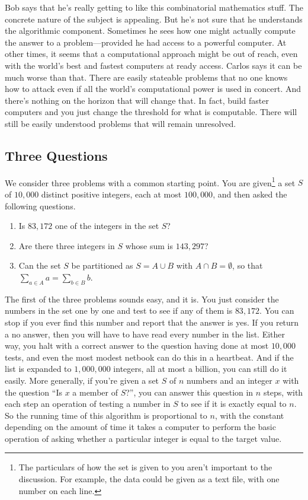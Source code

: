 \begin{discussion}
Bob says that he's really getting to like this combinatorial
mathematics stuff. The concrete nature of the subject is appealing.
But he's not sure that he understands the algorithmic component.
Sometimes he sees how one might actually compute the answer to a
problem---provided he had access to a powerful computer.  At other
times, it seems that a computational approach might be out of
reach, even with the world's best and fastest computers at ready
access.  Carlos says it can be much worse than that.  There are
easily stateable problems that no one knows how to attack even
if all the world's computational power is used in concert.  And there's nothing on the
horizon that will change that.  In fact, build faster computers and
you just change the threshold for what is computable.  There will still
be easily understood problems that will remain unresolved.
\end{discussion}

\subsection{Three Questions}\label{s:basics:questions}

We consider three problems with a common starting point.  You are
given\footnote{The particulars of how the set is given to you
aren't important to the discussion.  For example, the data could be given
as a text file, with one number on each line.} a set $S$ of 
$10,000$ distinct positive integers, each at most
$100,000$,  and then asked the following questions.

\begin{enumerate}
\item Is $83,172$ one of the integers in the set $S$?
\item Are there three integers in $S$ whose sum is $143,297$?
\item Can the set $S$ be partitioned as $S=A\cup B$ with
$A\cap B=\emptyset$, so that $\sum_{a\in A}a=\sum_{b\in B}b$.
\end{enumerate}

The first of the three problems sounds easy, and it is.  You just consider
the numbers in the set one by one and test to see if any of them is
$83,172$.  You can stop if you ever find this number and
report that the answer is yes.  If you return a no answer, then you
will have to have read every number in the list.  Either way, you halt
with a correct answer to the question having done at most $10,000$
tests, and even the most modest netbook can do this in a heartbeat.
And if the list is expanded to $1,000,000$ integers, all at most
a billion, you can still do it easily.  More generally, if you're
given a set $S$ of $n$ numbers and an integer $x$ with the question
``Is $x$ a member of $S$?'', you can answer this question in
$n$ steps, with each step an operation of testing a number in $S$
to see if it is exactly equal to $n$.  So the running time of this
algorithm is proportional to $n$, with the constant depending on
the amount of time it takes a computer to perform the basic operation
of asking whether a particular integer is equal to the target value.


